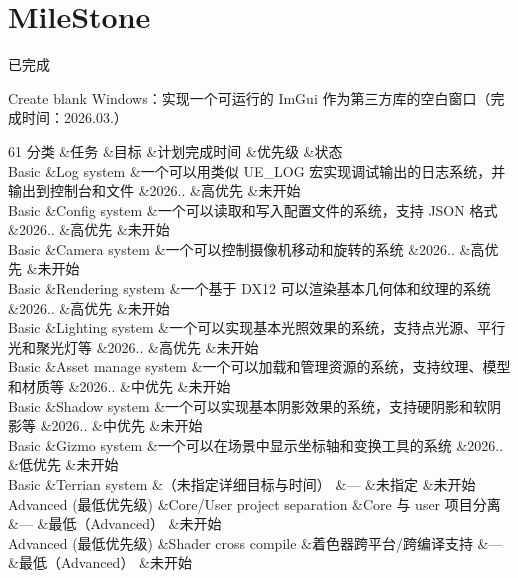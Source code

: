\chapter{Mile\+Stone }
\hypertarget{md__z_engine_2_mile_stone}{}\label{md__z_engine_2_mile_stone}
\label{md__z_engine_2_mile_stone_autotoc_md2}%
%


已完成
\begin{DoxyItemize}
\item {\ttfamily Create blank Windows}：实现一个可运行的 Im\+Gui 作为第三方库的空白窗口（完成时间：2026.03.）
\end{DoxyItemize}


\begin{DoxyTable}{6}{}{}{1}
分类  &任务  &目标  &计划完成时间  &优先级  &状态  \\
Basic  &Log system  &一个可以用类似 {\ttfamily UE\+\_\+\+LOG} 宏实现调试输出的日志系统，并输出到控制台和文件  &2026..  &高优先  &未开始  \\
Basic  &Config system  &一个可以读取和写入配置文件的系统，支持 JSON 格式  &2026..  &高优先  &未开始  \\
Basic  &Camera system  &一个可以控制摄像机移动和旋转的系统  &2026..  &高优先  &未开始  \\
Basic  &Rendering system  &一个基于 DX12 可以渲染基本几何体和纹理的系统  &2026..  &高优先  &未开始  \\
Basic  &Lighting system  &一个可以实现基本光照效果的系统，支持点光源、平行光和聚光灯等  &2026..  &高优先  &未开始  \\
Basic  &Asset manage system  &一个可以加载和管理资源的系统，支持纹理、模型和材质等  &2026..  &中优先  &未开始  \\
Basic  &Shadow system  &一个可以实现基本阴影效果的系统，支持硬阴影和软阴影等  &2026..  &中优先  &未开始  \\
Basic  &Gizmo system  &一个可以在场景中显示坐标轴和变换工具的系统  &2026..  &低优先  &未开始  \\
Basic  &Terrian system  &（未指定详细目标与时间）  &—  &未指定  &未开始  \\
Advanced (最低优先级)  &Core/\+\+User project separation  &Core 与 user 项目分离  &—  &最低（\+Advanced）  &未开始  \\
Advanced (最低优先级)  &Shader cross compile  &着色器跨平台/\+跨编译支持  &—  &最低（\+Advanced）  &未开始  \\
\end{DoxyTable}
